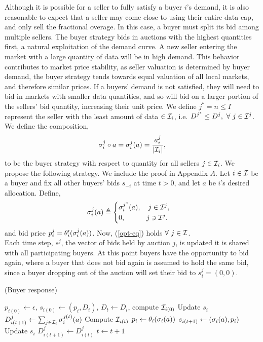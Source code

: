 Although it is possible for a seller to fully satisfy a buyer $i$'s demand, it
is also reasonable to expect that a seller may come close to using their
entire data cap, and only sell the fractional overage. In this case, a buyer
must split its bid among multiple sellers. 
The buyer strategy bids in auctions with the highest quantities first,
a natural exploitation of the demand curve. A new seller entering the market
with a large quantity of data will be in high demand. This behavior contributes to market price
stability, as seller valuation is determined by buyer demand, the
buyer strategy tends towards equal valuation of all local markets, and therefore
similar prices. If a buyers' demand is not satisfied, they will need to bid in
markets with smaller data quantities, and so will bid on a larger portion of
the sellers' bid quantity, increasing their unit price. 
We define $j^* = n \le I$ represent the seller with the least amount of data
$\in\mathcal{I}_i$, i.e. $D^{j^*} \le D^j, \ \forall\ j \in\mathcal{I}^j$.
We define the composition,
$$
     \sigma_i^j \circ a = \sigma_i^j(a) = \frac{a_i^j}{\vert \mathcal{I}_i \vert},
$$
to be the buyer strategy with respect to quantity for all sellers $j\in\mathcal{I}_i$.
We propose the following strategy. We include the proof in Appendix $A$.
{
\label{buyerstrategy}
Let $i\in\mathcal{I}$ be a buyer and fix all other buyers' bids $s_{-i}$ at time
$t>0$, and let $a$ be $i$'s desired allocation. 
Define,
\begin{equation}\label{opt-eq}
    \sigma_i^j(a) \triangleq \begin{cases} \sigma_i^{j^*}(a), \quad j\in\mathcal{I}^j,\\
            0, \quad\qquad j\ni\mathcal{I}^j.\end{cases}
\end{equation}
and bid price $p_i^j = \theta_i'(\sigma_i^j(a))$.
Now, (\ref{opt-eq}) holds $\forall \ j\in\mathcal{I}$.
}\\
Each time step, $s^j$, the vector of bids held by auction $j$, is updated it is shared with all
participating buyers. At this point buyers have the opportunity to bid again,
where a buyer that does not bid again is assumed to hold the same bid, since a
buyer dropping out of the auction will set their bid to $s_i^j=(0,0)$.

\begin{center}
\begin{algorithm}[H]
\caption{(Buyer response)}
\begin{algorithmic}[1]
\State $p_{i(0)} \gets \epsilon$, $s_{i(0)} \gets (p_i, D_i)$, $D_t \gets D_i$, compute
$\mathcal{I}_{i(0)}$
\State Update $s_i$ 
\State $D_{i(t+1)}^j \gets \sum_{j\in\mathcal{I}_i}\sigma_i^{j(t)}(a)$
    \State Compute $\mathcal{I}_{i(t)}$
    \State $p_i \gets \theta_i(\sigma_i(a))$
\EndIf
\State $s_{i(t+1)} \gets (\sigma_i(a), p_i)$
\State Update $s_i$
\State $D_{i(t+1)}^j \gets D_{i(t)}^j$
\State $t \gets t+1$
\EndWhile
\end{algorithmic}
\end{algorithm}
\end{center}

